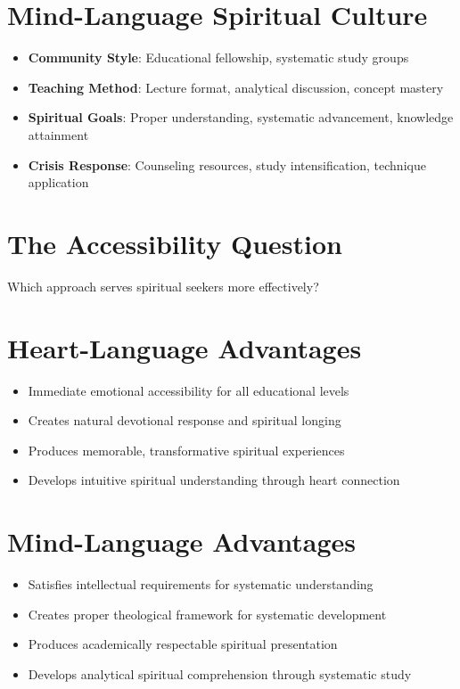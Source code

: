 \documentclass[11pt,twoside]{book}
\begin{document}
\section*{Mind-Language Spiritual Culture}
\label{sec:org622ba41}
\begin{itemize}
\item \textbf{\textbf{Community Style}}: Educational fellowship, systematic study groups
\item \textbf{\textbf{Teaching Method}}: Lecture format, analytical discussion, concept mastery
\item \textbf{\textbf{Spiritual Goals}}: Proper understanding, systematic advancement, knowledge attainment
\item \textbf{\textbf{Crisis Response}}: Counseling resources, study intensification, technique application
\end{itemize}
\section*{The Accessibility Question}
\label{sec:org3ad6efa}

Which approach serves spiritual seekers more effectively?
\section*{Heart-Language Advantages}
\label{sec:orgbd068ae}
\begin{itemize}
\item Immediate emotional accessibility for all educational levels
\item Creates natural devotional response and spiritual longing
\item Produces memorable, transformative spiritual experiences
\item Develops intuitive spiritual understanding through heart connection
\end{itemize}
\section*{Mind-Language Advantages}
\label{sec:orgaca5163}
\begin{itemize}
\item Satisfies intellectual requirements for systematic understanding
\item Creates proper theological framework for systematic development
\item Produces academically respectable spiritual presentation
\item Develops analytical spiritual comprehension through systematic study
\end{itemize}
\end{document}
